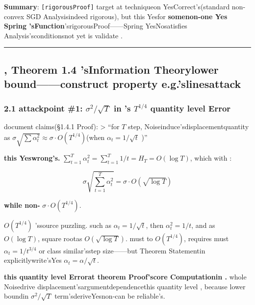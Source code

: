 \documentclass[
  12pt,
]{article}
\begin{document}
\textbf{Summary}: \texttt{{[}rigorousProof{]}} target at techniqueon YesCorrect's(standard non-convex
SGD Analysisindeed rigorous), but this Yesfor \textbf{somenon-one Yes Spring
'sFunction}'srigorousProof------Spring YesNosatisfies Analysis'sconditionsnot yet is validate . 

\begin{center}\rule{0.5\linewidth}{0.5pt}\end{center}

\subsection{, Theorem 1.4
'sInformation Theorylower bound------construct property e.g.'slinesattack}\label{ux4e8ctheorem-1.4-ux7684ux4fe1ux606fux8bbaux4e0bux754cux6784ux9020ux6027ux793aux4f8bux7684ux9010ux884cux653bux51fb}

\subsubsection{\texorpdfstring{2.1 attackpoint  \#1: \(\sigma^2/\sqrt{T}\)
in 's \(T^{1/4}\)
quantity level Error}{2.1 attackpoint  \#1: \textbackslash sigma\^{}2/\textbackslash sqrt\{T\} in 's T\^{}\{1/4\} quantity level Error}}\label{ux653bux51fbux70b9-1sigma2sqrtt-ux4e2dux7684-t14-ux91cfux7ea7ux9519ux8bef}

document claims(§1.4.1 Proof): \textgreater{} ``for  \(T\)
step, Noiseinduce'sdisplacementquantity as 
\(\sigma \sqrt{\sum \alpha_t^2} \approx \sigma \cdot O(T^{1/4})\)(when 
\(\alpha_t = 1/\sqrt{t}\) )''

\textbf{this Yeswrong's. }
\(\sum_{t=1}^T \alpha_t^2 = \sum_{t=1}^T 1/t = H_T = O(\log T)\), which with : 

\[\sigma \sqrt{\sum_{t=1}^T \alpha_t^2} = \sigma \cdot O(\sqrt{\log T})\]

\textbf{while non-} \(\sigma \cdot O(T^{1/4})\). 

\(O(T^{1/4})\) 'ssource puzzling. such as  \(\alpha_t = 1/\sqrt{t}\), then 
\(\alpha_t^2 = 1/t\), and as  \(O(\log T)\), square rootas 
\(O(\sqrt{\log T})\). must to  \(O(T^{1/4})\), requires must 
\(\alpha_t = 1/t^{3/4}\) or class similar'sstep size------but Theorem Statementin explicitlywrite'sYes
\(\alpha_t = \alpha/\sqrt{t}\). 

\textbf{this quantity level Errorat theorem Proof'score Computationin . }
whole Noisedrive displacement'sargumentdependencethis quantity level , because lower boundin  \(\sigma^2/\sqrt{T}\)
term'sderiveYesnon-can be reliable's. 
\end{document}
